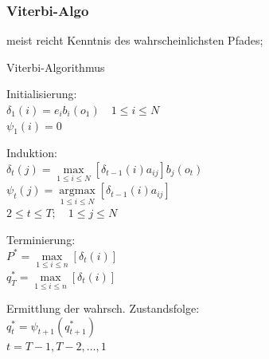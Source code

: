 \documentclass[german,color,6pt]{latex4ei/latex4ei_sheet}
\begin{document}
\begin{sectionbox}
\subsubsection{Viterbi-Algo}
meist reicht Kenntnis des wahrscheinlichsten Pfades; 
\begin{cookbox}{Viterbi-Algorithmus}
	\item Initialisierung: \\
		$\delta_1 (i) = e_i b_i (o_1) \quad 1 \leq i \leq N $\\
		$\psi _1 (i) = 0$\\
	\item Induktion: \\
		$\delta_t (j) = \max\limits_{1 \leq i \leq N }\left[ \delta_{t-1} (i) a_{ij} \right] b_j (o_t)$\\
		$\psi_t(j) = \underset{1 \leq i \leq N}{\operatorname{argmax}} \left[\delta_{t-1}(i) a_{ij} \right]$\\
		$2 \leq t \leq T; \quad 1 \leq j \leq N$\\
	\item Terminierung: \\
		$P^* = \max\limits_{1 \leq i \leq n} [\delta_t(i)]$\\
		$q_T^* = \max\limits_{1 \leq i \leq n} [\delta_t(i)]$\\
	\item Ermittlung der wahrsch. Zustandsfolge:\\
		$q_t^* = \psi_{t+1}(q^*_{t+1})$\\
		$t= T-1, T-2, \dots , 1$\\
\end{cookbox}
\end{sectionbox}







\end{document}
